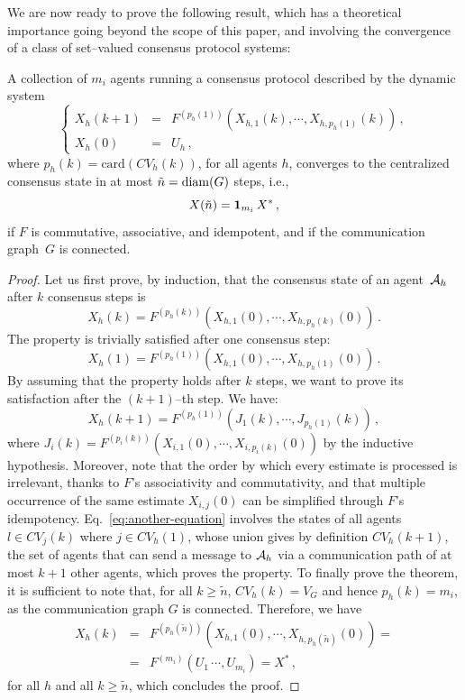\documentclass[journal, onecolumn, 12pt]{styles/IEEEtran}
\begin{document}
We are now ready to prove the following result, which has a theoretical importance going beyond the scope of this paper, and involving the convergence of a class of set--valued consensus protocol systems: 
\begin{theorem}
\label{th:consensus}
A collection of $m_i$ agents running a consensus protocol described by the dynamic system
$$
\left\lbrace
\begin{array}{rcl}
X_h(k+1) & = & F^{(p_h(1))}(X_{h,1}(k), \cdots, X_{h, p_h(1)}(k)) \, , \\
X_h(0) & = & U_h \, ,
\end{array}
\right.
$$
where $p_h(k) = \mbox{card}(CV_h(k))$, for all agents $h$, converges to the centralized consensus state in at most $\tilde{n}=\mathrm{diam}(G)$ steps, i.e.,
$$
X(\tilde{n}) = {\bf 1}_{m_i} \, X^* \, ,
$$
if $F$ is commutative, associative, and idempotent, and if the communication graph~$G$ is connected.
\begin{proof}
Let us first prove, by induction, that the consensus state of an agent~$\mathcal{A}_h$ after $k$ consensus steps is
$$
X_h(k) = F^{(p_h(k))}(X_{h,1}(0), \cdots, X_{h,p_h(k)}(0)) \, .
$$
The property is trivially satisfied after one consensus step:
$$
X_h(1) = F^{(p_h(1))}(X_{h,1}(0), \cdots, X_{h,p_h(1)}(0)) \, .
$$ 
By assuming that the property holds after $k$ steps, we want to prove its satisfaction after the $(k+1)$--th step. We have:
\begin{equation}
\label{eq:another-equation}
X_h(k+1) = F^{(p_h(1))}(J_1(k), \cdots, J_{p_h(1)}(k)) \, ,
\end{equation}
where $J_i(k) = F^{(p_i(k))}(X_{i,1}(0), \cdots, X_{i,p_i(k)}(0))$ by the inductive hypothesis. Moreover, note that the order by which every estimate is processed is irrelevant, thanks to $F$'s associativity and commutativity, and that multiple occurrence of the same estimate $X_{i,j}(0)$ can be simplified through $F$'s idempotency. Eq.~\ref{eq:another-equation} involves the states of all agents $l \in CV_j(k)$ where $j \in CV_h(1)$, whose union gives by definition $CV_h(k+1)$, the set of agents that can send a message to $\mathcal{A}_h$ via a communication path of at most $k+1$ other agents, which proves the property. To finally prove the theorem, it is sufficient to note that, for all $k \geq \tilde{n}$, $CV_h(k) = V_G$ and hence $p_h(k)=m_i$, as the communication graph $G$ is connected. Therefore, we have
\begin{equation*}
\begin{array}{rcl}
X_h(k) & = & F^{(p_h(\tilde{n}))}(X_{h,1}(0), \cdots, X_{h,p_h(\tilde{n})}(0)) =
\\
& = & F^{(m_i)}(U_1 \, \cdots, U_{m_i}) = X^* \, ,
\end{array}
\end{equation*}
for all $h$ and all $k \geq \tilde{n}$, which concludes the proof.
\end{proof} 
\end{theorem}
\end{document}
